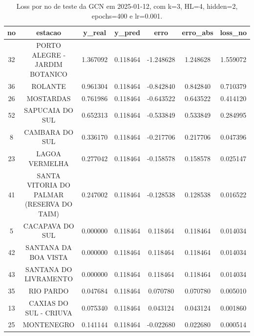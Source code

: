 \begin{table}[h]
\centering
\caption{Loss por no de teste da GCN em 2025-01-12, com k=3, HL=4, hidden=2, epochs=400 e lr=0.001.}
\label{tab:gcn_loss_k3_hl4_h2_e400_d20250112}
\begin{tabular}{ccccccc}
\toprule
no & estacao & y\_real & y\_pred & erro & erro\_abs & loss\_no \\
\midrule
32 & PORTO ALEGRE - JARDIM BOTANICO & 1.367092 & 0.118464 & -1.248628 & 1.248628 & 1.559072 \\
36 & ROLANTE & 0.961304 & 0.118464 & -0.842840 & 0.842840 & 0.710379 \\
26 & MOSTARDAS & 0.761986 & 0.118464 & -0.643522 & 0.643522 & 0.414120 \\
52 & SAPUCAIA DO SUL & 0.652313 & 0.118464 & -0.533849 & 0.533849 & 0.284995 \\
8 & CAMBARA DO SUL & 0.336170 & 0.118464 & -0.217706 & 0.217706 & 0.047396 \\
23 & LAGOA VERMELHA & 0.277042 & 0.118464 & -0.158578 & 0.158578 & 0.025147 \\
41 & SANTA VITORIA DO PALMAR (RESERVA DO TAIM) & 0.247002 & 0.118464 & -0.128538 & 0.128538 & 0.016522 \\
5 & CACAPAVA DO SUL & 0.000000 & 0.118464 & 0.118464 & 0.118464 & 0.014034 \\
42 & SANTANA DA BOA VISTA & 0.000000 & 0.118464 & 0.118464 & 0.118464 & 0.014034 \\
43 & SANTANA DO LIVRAMENTO & 0.000000 & 0.118464 & 0.118464 & 0.118464 & 0.014034 \\
35 & RIO PARDO & 0.047684 & 0.118464 & 0.070780 & 0.070780 & 0.005010 \\
13 & CAXIAS DO SUL - CRIUVA & 0.075340 & 0.118464 & 0.043124 & 0.043124 & 0.001860 \\
25 & MONTENEGRO & 0.141144 & 0.118464 & -0.022680 & 0.022680 & 0.000514 \\
\bottomrule
\end{tabular}
\end{table}

